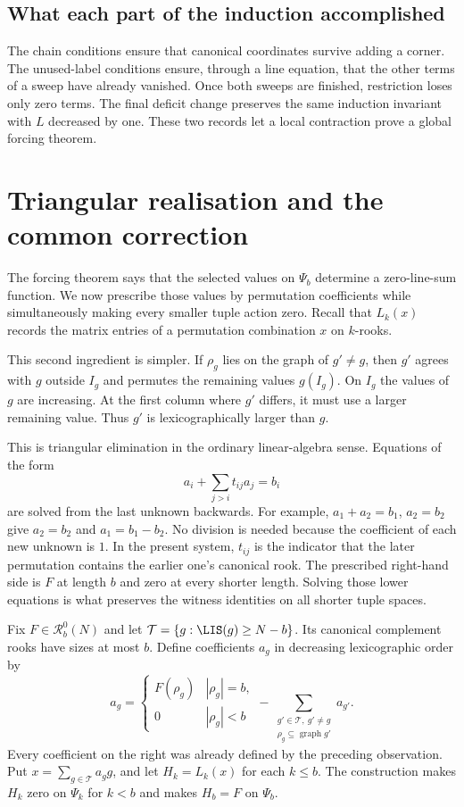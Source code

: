 \documentclass[11pt,a4paper,oneside,openany]{book}
\theoremstyle{definition}\newtheorem{definition}[theorem]{Definition}
\theoremstyle{remark}\newtheorem{remark}[theorem]{Remark}
\numberwithin{equation}{chapter}
\begin{document}
\subsection{What each part of the induction accomplished}
The chain conditions ensure that canonical coordinates survive adding a corner. The unused-label conditions ensure, through a line equation, that the other terms of a sweep have already vanished. Once both sweeps are finished, restriction loses only zero terms. The final deficit change preserves the same induction invariant with $L$ decreased by one. These two records let a local contraction prove a global forcing theorem.

\section{Triangular realisation and the common correction}\label{tx:sec:realization}
The forcing theorem says that the selected values on $\Psi_b$
determine a zero-line-sum function. We now prescribe those values by
permutation coefficients while simultaneously making every smaller
tuple action zero. Recall that $L_k(x)$ records the matrix entries of
a permutation combination $x$ on $k$-rooks.

This second ingredient is simpler. If $\rho_g$ lies on the graph of $g'\ne g$, then $g'$ agrees with $g$ outside $I_g$ and permutes the remaining values $g(I_g)$. On $I_g$ the values of $g$ are increasing. At the first column where $g'$ differs, it must use a larger remaining value. Thus $g'$ is lexicographically larger than $g$.

This is triangular elimination in the ordinary linear-algebra sense.
Equations of the form
\[
                   a_i+\sum_{j>i}t_{ij}a_j=b_i
\]
are solved from the last unknown backwards. For example,
$a_1+a_2=b_1$, $a_2=b_2$ give $a_2=b_2$ and $a_1=b_1-b_2$.
No division is needed because the coefficient of each new unknown
is $1$. In the present system, $t_{ij}$ is the indicator that the
later permutation contains the earlier one's canonical rook. The
prescribed right-hand side is $F$ at length $b$ and zero at every
shorter length. Solving those lower equations is what preserves
the witness identities on all shorter tuple spaces.

Fix $F\in \mathcal R_b^{0}(N)$ and let $\mathcal T=\{g:\LIS(g)\ge N-b\}$. Its canonical complement rooks have sizes at most $b$. Define coefficients $a_g$ in decreasing lexicographic order by
\begin{equation}\label{tx:eq:triangular}
a_g=\begin{cases}F(\rho_g)&|\rho_g|=b,\\0&|\rho_g|<b\end{cases}
-\sum_{\substack{g'\in\mathcal T,\ g'\ne g\\\rho_g\subseteq\operatorname{graph}g'}}a_{g'}.
\end{equation}
Every coefficient on the right was already defined by the preceding observation. Put $x=\sum_{g\in\mathcal T}a_gg$, and let $H_k=L_k(x)$ for each $k\le b$. The construction makes $H_k$ zero on $\Psi_k$ for $k<b$ and makes $H_b=F$ on $\Psi_b$.
\end{document}

